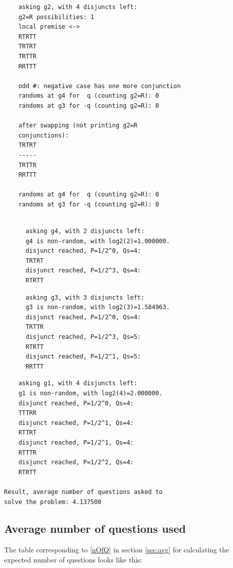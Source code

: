 \documentclass[twoside,twocolumn,a4paper,11pt]{article}
\theoremstyle{definition}
\begin{document}
\begin{verbatim}

\end{verbatim}
\vspace{-40pt}
\begin{verbatim}
    asking g2, with 4 disjuncts left:
    g2=R possibilities: 1
    local premise <->
    RTRTT
    TRTRT
    TRTTR
    RRTTT

    odd #: negative case has one more conjunction
    randoms at g4 for  q (counting g2=R): 0
    randoms at g3 for -q (counting g2=R): 0

    after swapping (not printing g2=R 
    conjunctions):
    TRTRT
    -----
    TRTTR
    RRTTT

    randoms at g4 for  q (counting g2=R): 0
    randoms at g3 for -q (counting g2=R): 0
\end{verbatim}
\vspace{-22pt}
\begin{verbatim}

      asking g4, with 2 disjuncts left:
      g4 is non-random, with log2(2)=1.000000.
      disjunct reached, P=1/2^0, Qs=4:
      TRTRT
      disjunct reached, P=1/2^3, Qs=4:
      RTRTT
\end{verbatim}
\vspace{-14pt}
\begin{verbatim}
      asking g3, with 3 disjuncts left:
      g3 is non-random, with log2(3)=1.584963.
      disjunct reached, P=1/2^0, Qs=4:
      TRTTR
      disjunct reached, P=1/2^3, Qs=5:
      RTRTT
      disjunct reached, P=1/2^1, Qs=5:
      RRTTT
\end{verbatim}
\vspace{-14pt}
\begin{verbatim}
    asking g1, with 4 disjuncts left:
    g1 is non-random, with log2(4)=2.000000.
    disjunct reached, P=1/2^0, Qs=4:
    TTTRR
    disjunct reached, P=1/2^1, Qs=4:
    RTTRT
    disjunct reached, P=1/2^1, Qs=4:
    RTTTR
    disjunct reached, P=1/2^2, Qs=4:
    RTRTT

Result, average number of questions asked to 
solve the problem: 4.137500
\end{verbatim}


\subsection{Average number of questions used}

The table corresponding to \eqref{nOfQ} in section \ref{sec:avg}
for calculating the expected number of questions looks like this:
\end{document}
